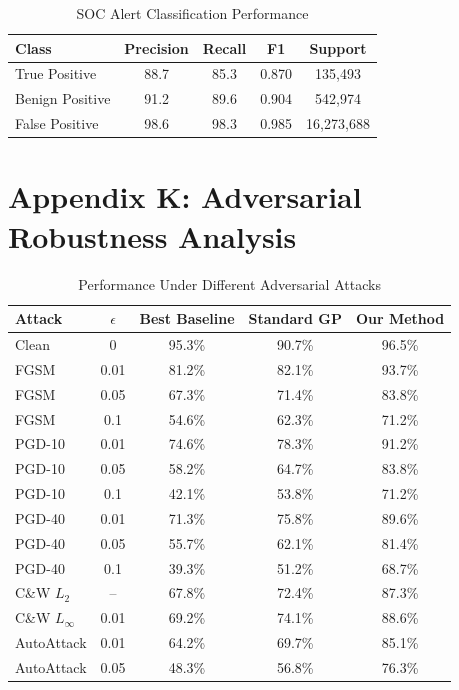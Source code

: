 \documentclass[12pt]{article}
\begin{document}
\begin{table}[H]
\centering
\caption{SOC Alert Classification Performance}
\begin{tabular}{lcccc}
\toprule
\textbf{Class} & \textbf{Precision} & \textbf{Recall} & \textbf{F1} & \textbf{Support} \\
\midrule
True Positive & 88.7 & 85.3 & 0.870 & 135,493 \\
Benign Positive & 91.2 & 89.6 & 0.904 & 542,974 \\
False Positive & 98.6 & 98.3 & 0.985 & 16,273,688 \\
\bottomrule
\end{tabular}
\end{table}

\section{Appendix K: Adversarial Robustness Analysis}

\begin{table}[H]
\centering
\caption{Performance Under Different Adversarial Attacks}
\begin{tabular}{lcccc}
\toprule
\textbf{Attack} & \textbf{$\epsilon$} & \textbf{Best Baseline} & \textbf{Standard GP} & \textbf{Our Method} \\
\midrule
Clean & 0 & 95.3\% & 90.7\% & 96.5\% \\
FGSM & 0.01 & 81.2\% & 82.1\% & 93.7\% \\
FGSM & 0.05 & 67.3\% & 71.4\% & 83.8\% \\
FGSM & 0.1 & 54.6\% & 62.3\% & 71.2\% \\
\midrule
PGD-10 & 0.01 & 74.6\% & 78.3\% & 91.2\% \\
PGD-10 & 0.05 & 58.2\% & 64.7\% & 83.8\% \\
PGD-10 & 0.1 & 42.1\% & 53.8\% & 71.2\% \\
\midrule
PGD-40 & 0.01 & 71.3\% & 75.8\% & 89.6\% \\
PGD-40 & 0.05 & 55.7\% & 62.1\% & 81.4\% \\
PGD-40 & 0.1 & 39.3\% & 51.2\% & 68.7\% \\
\midrule
C\&W $L_2$ & -- & 67.8\% & 72.4\% & 87.3\% \\
C\&W $L_\infty$ & 0.01 & 69.2\% & 74.1\% & 88.6\% \\
\midrule
AutoAttack & 0.01 & 64.2\% & 69.7\% & 85.1\% \\
AutoAttack & 0.05 & 48.3\% & 56.8\% & 76.3\% \\
\bottomrule
\end{tabular}
\end{table}
\end{document}
